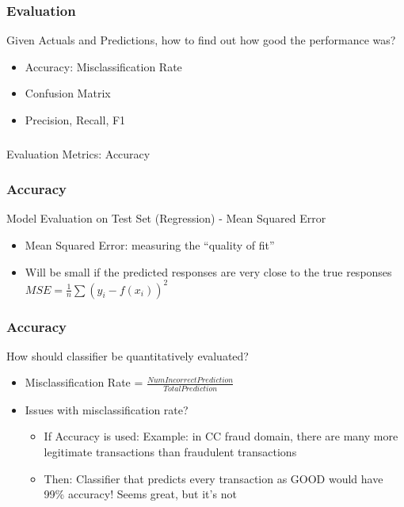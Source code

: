 \begin{frame}[fragile]\frametitle{Evaluation}
Given Actuals and Predictions, how to find out how good the performance was?
\begin{itemize}
\item Accuracy: Misclassification Rate
\item Confusion Matrix
\item Precision, Recall, F1
\end{itemize}
\end{frame}

\begin{frame}[fragile]\frametitle{}
\begin{center}
{\Large Evaluation Metrics: Accuracy}
\end{center}
\end{frame}

\begin{frame}[fragile]\frametitle{Accuracy}
Model Evaluation on Test Set (Regression) - Mean Squared Error
\begin{itemize}
\item Mean Squared Error: measuring the ``quality of fit''
\item Will be small if the predicted responses are very close to the true responses
$MSE = \frac{1}{n} \sum (y_i - f(x_i))^2$
\end{itemize}
\end{frame}

\begin{frame}[fragile]\frametitle{Accuracy}
How should classifier be quantitatively evaluated?
\begin{itemize}
\item Misclassification Rate = $\frac{NumIncorrectPrediction}{TotalPrediction}$
\item Issues with misclassification rate?
	\begin{itemize}
	\item If Accuracy is used: Example: in CC fraud domain, there are many more legitimate transactions than fraudulent transactions
	\item Then: Classifier that predicts every transaction as GOOD would have 99\% accuracy! Seems great, but it's not
	\end{itemize}
\end{itemize}

\end{frame}


